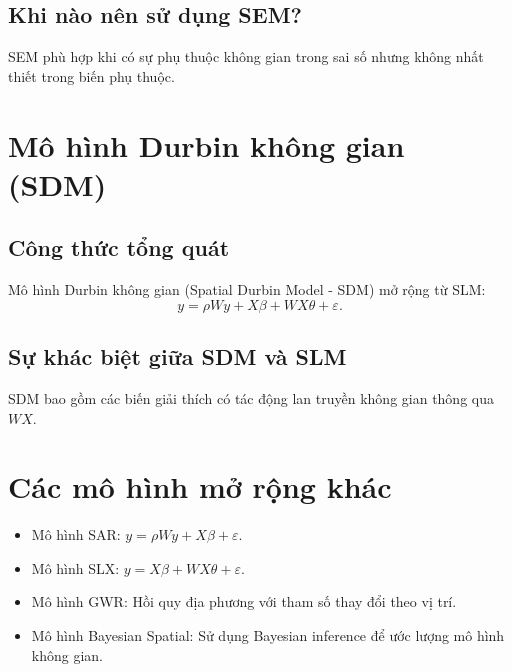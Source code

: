 \subsection{Khi nào nên sử dụng SEM?}
SEM phù hợp khi có sự phụ thuộc không gian trong sai số nhưng không nhất thiết trong biến phụ thuộc.

\section{Mô hình Durbin không gian (SDM)}
\subsection{Công thức tổng quát}
Mô hình Durbin không gian (Spatial Durbin Model - SDM) mở rộng từ SLM:
\begin{equation}
    y = \rho W y + X \beta + W X \theta + \varepsilon.
\end{equation}

\subsection{Sự khác biệt giữa SDM và SLM}
SDM bao gồm các biến giải thích có tác động lan truyền không gian thông qua $W X$.

\section{Các mô hình mở rộng khác}
\begin{itemize}
    \item Mô hình SAR: $y = \rho W y + X \beta + \varepsilon$.
    \item Mô hình SLX: $y = X \beta + W X \theta + \varepsilon$.
    \item Mô hình GWR: Hồi quy địa phương với tham số thay đổi theo vị trí.
    \item Mô hình Bayesian Spatial: Sử dụng Bayesian inference để ước lượng mô hình không gian.
\end{itemize}
